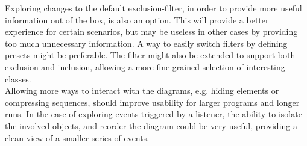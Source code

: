 Exploring changes to the default exclusion-filter, in order to provide more useful information out of the box, is also an option.
This will provide a better experience for certain scenarios, but may be useless in other cases by providing too much unnecessary information.
A way to easily switch filters by defining presets might be preferable.
The filter might also be extended to support both exclusion and inclusion, allowing a more fine-grained selection of interesting classes.
~\\

Allowing more ways to interact with the diagrams, e.g. hiding elements or compressing sequences, should improve usability for larger programs and longer runs.
In the case of exploring events triggered by a listener, the ability to isolate the involved objects, and reorder the diagram could be very useful, providing a clean view of a smaller series of events.%
